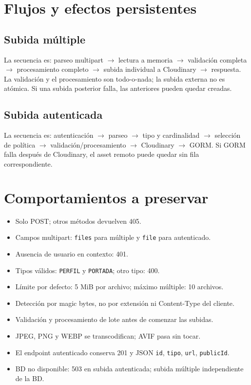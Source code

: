 \documentclass[11pt,a4paper]{article}
\begin{document}
\section{Flujos y efectos persistentes}
\subsection{Subida múltiple}
La secuencia es: parseo multipart $\rightarrow$ lectura a memoria $\rightarrow$ validación completa $\rightarrow$ procesamiento completo $\rightarrow$ subida individual a Cloudinary $\rightarrow$ respuesta. La validación y el procesamiento son todo-o-nada; la subida externa no es atómica. Si una subida posterior falla, las anteriores pueden quedar creadas.

\subsection{Subida autenticada}
La secuencia es: autenticación $\rightarrow$ parseo $\rightarrow$ tipo y cardinalidad $\rightarrow$ selección de política $\rightarrow$ validación/procesamiento $\rightarrow$ Cloudinary $\rightarrow$ GORM. Si GORM falla después de Cloudinary, el asset remoto puede quedar sin fila correspondiente.

\section{Comportamientos a preservar}
\begin{itemize}
\item Solo POST; otros métodos devuelven 405.
\item Campos multipart: \nolinkurl{files} para múltiple y \nolinkurl{file} para autenticado.
\item Ausencia de usuario en contexto: 401.
\item Tipos válidos: \nolinkurl{PERFIL} y \nolinkurl{PORTADA}; otro tipo: 400.
\item Límite por defecto: 5 MiB por archivo; máximo múltiple: 10 archivos.
\item Detección por magic bytes, no por extensión ni Content-Type del cliente.
\item Validación y procesamiento de lote antes de comenzar las subidas.
\item JPEG, PNG y WEBP se transcodifican; AVIF pasa sin tocar.
\item El endpoint autenticado conserva 201 y JSON \nolinkurl{id}, \nolinkurl{tipo}, \nolinkurl{url}, \nolinkurl{publicId}.
\item BD no disponible: 503 en subida autenticada; subida múltiple independiente de la BD.
\end{itemize}
\end{document}
